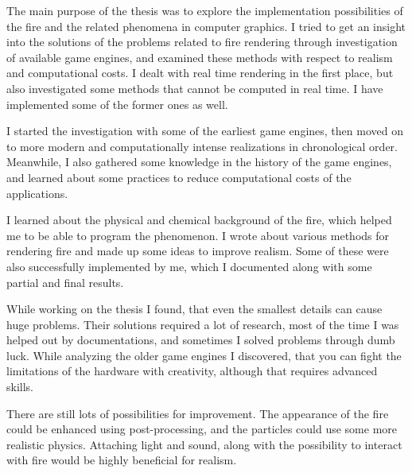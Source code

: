 


The main purpose of the thesis was to explore the implementation possibilities of the fire and the related phenomena in computer graphics. I tried to get an insight into the solutions of the problems related to fire rendering through investigation of available game engines, and examined these methods with respect to realism and computational costs. I dealt with real time rendering in the first place, but also investigated some methods that cannot be computed in real time. I have implemented some of the former ones as well.

I started the investigation with some of the earliest game engines, then moved on to more modern and computationally intense realizations in chronological order. Meanwhile, I also gathered some knowledge in the history of the game engines, and learned about some practices to reduce computational costs of the applications. 

I learned about the physical and chemical background of the fire, which helped me to be able to program the phenomenon. I wrote about various methods for rendering fire and made up some ideas to improve realism. Some of these were also successfully implemented by me, which I documented along with some partial and final results.

While working on the thesis I found, that even the smallest details can cause huge problems. Their solutions required a lot of research, most of the time I was helped out by documentations, and sometimes I solved problems through dumb luck. While analyzing the older game engines I discovered, that you can fight the limitations of the hardware with creativity, although that requires advanced skills.

There are still lots of possibilities for improvement. The appearance of the fire could be enhanced using post-processing, and the particles could use some more realistic physics. Attaching light and sound, along with the possibility to interact with fire would be highly beneficial for realism.

